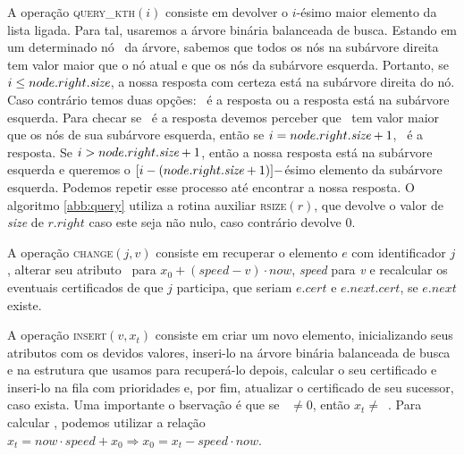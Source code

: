 A operação \textsc{query\_kth}$(i)$ consiste em devolver o $i$-ésimo
maior elemento da lista ligada. Para tal, usaremos a árvore binária
balanceada de busca. Estando em um determinado nó \no~da árvore,
sabemos que todos os nós na subárvore direita tem valor maior que o
nó atual e que os nós da subárvore esquerda. Portanto, se $i \leq
node.right.\textit{size}$, a nossa resposta com certeza está na
subárvore direita do nó. Caso contrário temos duas opções: \no~é a
resposta ou a resposta está na subárvore esquerda. Para checar se
\no~é a resposta devemos perceber que \no~tem valor maior que os nós
de sua subárvore esquerda, então se $i = node.right.\textit{size} + 1$,
\no~é a resposta. Se $i > node.right.\textit{size} + 1$, então a nossa
resposta está na subárvore esquerda e queremos o $[i -
(node.right.\textit{size} + 1)]-$ésimo elemento da subárvore esquerda.
Podemos repetir esse processo até encontrar a nossa resposta. O
algoritmo \ref{abb:query} utiliza a rotina auxiliar
\textsc{rsize}$(r)$, que devolve o valor de \textit{size} de
$r.right$ caso este seja não nulo, caso contrário devolve $0$.





A operação \textsc{change}$(j, v)$ consiste em recuperar o
elemento $e$ com identificador $j$, alterar seu atributo
\initv~para $x_0 + (\mathit{speed} - v)\cdot now$,
\textit{speed} para \textit{v} e recalcular os eventuais
certificados de que $j$ participa, que seriam $e.cert$ e
$e.next.cert$, se $e.next$ existe.







A operação \textsc{insert}$(v, x_t)$ consiste em criar um novo
elemento, inicializando seus atributos com os devidos valores,
inseri-lo na árvore binária balanceada de busca e na estrutura
que usamos para recuperá-lo depois, calcular o seu certificado
e inseri-lo na fila com prioridades e, por fim, atualizar o
certificado de seu sucessor, caso exista. Uma importante o
bservação é que se \now~$\neq 0$, então $x_t \neq$~\initv.
Para calcular \initv, podemos utilizar a relação $x_t = now\cdot
speed + x_0 \Rightarrow x_0 = x_t - speed\cdot now$.

